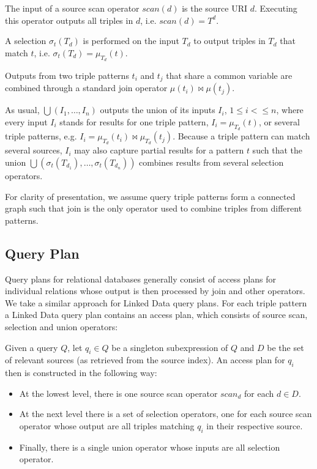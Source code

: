 \begin{definition} The input of a source scan operator $scan(d)$ is the source URI $d$.
Executing this operator outputs all triples in $d$, i.e. $scan(d) = T^d$.
\end{definition}

\begin{definition}[Selection]  A selection $\sigma_t(T_d)$ is performed on the input $T_d$ to output
triples in $T_d$ that match $t$, i.e. $\sigma_t(T_d) = \mu_{T_d}(t)$. 
\end{definition}

Outputs from two triple patterns $t_i$ and $t_j$ that share a common variable are combined through a standard join operator $\mu(t_i)\Join\mu(t_j)$. 

\begin{definition}[Union] As usual, $\bigcup(I_1,\ldots,I_n)$
outputs the union of its inputs $I_i$, $1\leq i < \leq n$, where every input $I_i$ stands for results for one triple pattern, $I_i = \mu_{T_d}(t)$, or several triple patterns, e.g. $I_i = \mu_{T_d}(t_i)\Join\mu_{T_d}(t_j)$. Because a triple pattern can match several sources, $I_i$ may also capture partial results for a pattern $t$ such that the union
$\bigcup(\sigma_t(T_{d_1}),\ldots,\sigma_t(T_{d_n}))$ combines results from several selection operators.   
\end{definition}

For clarity of presentation, we assume query triple patterns form a connected graph such that join is the only operator used to combine triples from different patterns. 


\subsection{Query Plan}
\label{sec:basicshape}
Query plans for relational databases generally consist of access plans
for individual relations whose output is then processed by join and
other operators. We take a similar approach for Linked Data query
plans. For each triple pattern a Linked Data query plan contains an
access plan, which consists of source scan, selection and union
operators:

\begin{definition}
  Given a query $Q$, let $q_i \in Q$ be a singleton subexpression of
  $Q$ and $D$ be the set of relevant sources (as retrieved from the
  source index). An access plan for $q_i$ then is constructed in the
  following way:
  \begin{itemize}
  \item At the lowest level, there is one source scan operator
    $scan_d$ for each $d \in D$.
  \item At the next level there is a set of selection operators, one
    for each source scan operator whose output are all triples
    matching $q_i$ in their respective source.
  \item Finally, there is a single union operator whose inputs are all
    selection operator.
  \end{itemize}
\end{definition}

